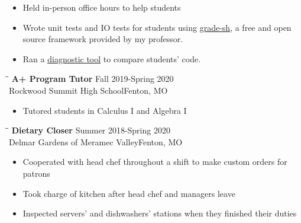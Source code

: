 \documentclass{res}
\begin{document}
\begin{resume}
\begin{tabbing}
   \end{tabbing}\vspace{-20pt}      %
    		\begin{itemize}
    			\item Held in-person office hours to help students
    			\item Wrote unit tests and IO tests for students using
    			\textcolor{blue}{\underline{\href{https://gitlab.com/classroomcode/grade-sh/grade-sh}{grade-sh}}}, 
    			a free and open source framework provided by my professor.
    			\item Ran a 
    			\textcolor{blue}{\underline{\href{https://gitlab.com/classroomcode/copy_checker}{diagnostic tool}}}
    			to compare students' code.
    		\end{itemize}
   \begin{tabbing}
   \hspace{2.3in}\= \hspace{2.6in}\= \kill %
    {\bf A+ Program Tutor} \>\>Fall 2019-Spring 2020\\
     	Rockwood Summit High School\>\>Fenton, MO\\
   \end{tabbing}\vspace{-20pt}
    \begin{itemize}
    		\item Tutored students in Calculus I and Algebra I
    \end{itemize}
    \begin{tabbing}
   \hspace{2.3in}\= \hspace{2.6in}\= \kill %
    {\bf Dietary Closer} \>\>Summer 2018-Spring 2020\\
     	Delmar Gardens of Meramec Valley\>\>Fenton, MO\\
   \end{tabbing}\vspace{-20pt}
    \begin{itemize}
    		\item Cooperated with head chef throughout a shift to
    		make custom orders for patrons
    		\item Took charge of kitchen after head chef and managers leave
    		\item Inspected servers' and dishwashers' stations when they finished
    		their duties
    \end{itemize}
            



\end{resume}
\end{document}
